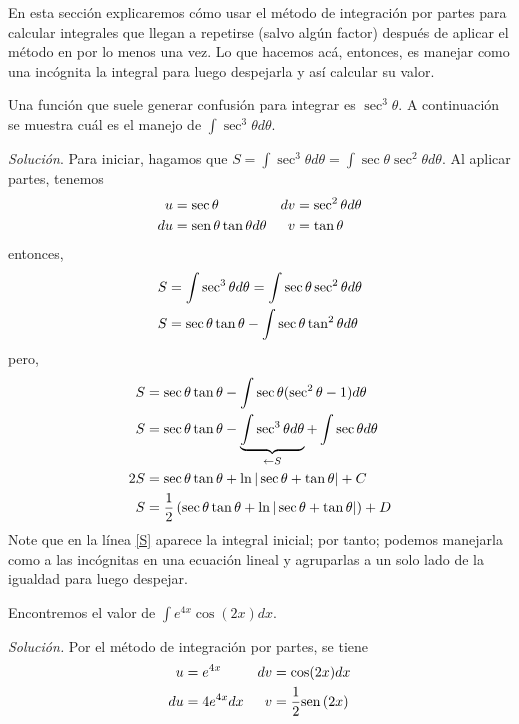 En esta sección explicaremos cómo usar el método de integración por partes para calcular integrales que llegan a repetirse (salvo algún factor) después de aplicar el método en por lo menos una vez. Lo que hacemos acá, entonces, es manejar como una incógnita la integral para luego despejarla y así calcular su valor.

\begin{ejemplo} 
\textnormal{Una función que suele generar confusión para integrar es \textit{$\sec^3\theta$}. A continuación se muestra cuál es el manejo de} {\small $\displaystyle{\int \sec ^{3}\theta d\theta }$.}
\end{ejemplo}

\textit{Solución}. Para iniciar, hagamos que $S=\displaystyle{\int \sec ^{3}\theta d\theta=\int \sec\theta \sec^{2}\theta d\theta}$. Al aplicar partes, tenemos
\begin{align*}
u&=\sec \theta & dv&=\sec ^{2}\theta d\theta\\
du&=\text{\rm sen}\, \theta \tan \theta d\theta & v&=\tan \theta
\end{align*}
entonces,
\begin{align}\label{S}
S&=\int \sec ^{3}\theta d\theta=\int \sec\theta \sec^{2}\theta d\theta\notag\\
S&=\sec \theta \tan \theta -\int \sec \theta \tan ^{2}\theta d\theta\notag
\end{align}
pero,
{\small
\begin{align}
S&=\sec \theta \tan \theta -\int \sec \theta (\sec ^{2}\theta -1)d\theta\notag\\
S&=\sec \theta \tan \theta -\underbrace{\int \sec ^{3}\theta d\theta }_{\leftarrow S}+\int\sec \theta d\theta \\
2S&=\sec \theta \tan \theta +\ln |\sec \theta +\tan \theta |+C\notag\\
S&=\frac{1}{2}\left(\sec \theta \tan \theta +\ln |\sec \theta +\tan \theta |\right)+D\notag
\end{align}
}
Note que en la línea \eqref{S} aparece la integral inicial; por tanto; podemos manejarla como a las incógnitas en una ecuación lineal y agruparlas a un solo lado de la igualdad para luego despejar. 

\begin{ejemplo}
\textnormal{Encontremos el valor de} $\displaystyle{\int e^{4x}\cos (2x)dx}$.
\end{ejemplo}
\textit{Solución.} Por el método de integración por partes, se tiene
{\small
\begin{align*}
u&=e^{4x} & dv&=\cos (2x)dx \\
du&=4e^{4x}dx & v&=\frac{1}{2}\text{\rm sen}\, (2x)
\end{align*}
}


